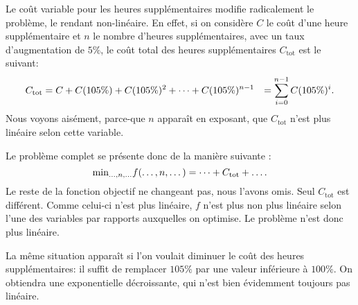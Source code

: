 Le coût variable pour les heures supplémentaires modifie radicalement le problème, le rendant non-linéaire. En effet, si on considère $C$ le coût d'une heure supplémentaire et $n$ le nombre d'heures supplémentaires, avec un taux d'augmentation de $5\%$, le coût total des heures supplémentaires $C_\text{tot}$ est le suivant:
\begin{align*}
    C_\text{tot}
    &= C + C (105\%) + C (105\%)^2 + \dots + C (105\%)^{n-1}
    &= \sum_{i=0}^{n-1} C (105\%)^i
    \text.
\end{align*}
Nous voyons aisément, parce-que $n$ apparaît en exposant, que $C_\text{tot}$ n'est plus linéaire selon cette variable.

Le problème complet se présente donc de la manière suivante :
\[
    \text{min}_{\dots,n,\dots} f(\dots,n,\dots) = \dots + C_\text{tot} + \dots
    \text.
\]
Le reste de la fonction objectif ne changeant pas, nous l'avons omis. Seul $C_\text{tot}$ est différent. Comme celui-ci n'est plus linéaire, $f$ n'est plus non plus linéaire selon l'une des variables par rapports auxquelles on optimise. Le problème n'est donc plus linéaire.

La même situation apparaît si l'on voulait diminuer le coût des heures supplémentaires: il suffit de remplacer $105\%$ par une valeur inférieure à $100\%$. On obtiendra une exponentielle décroissante, qui n'est bien évidemment toujours pas linéaire.
